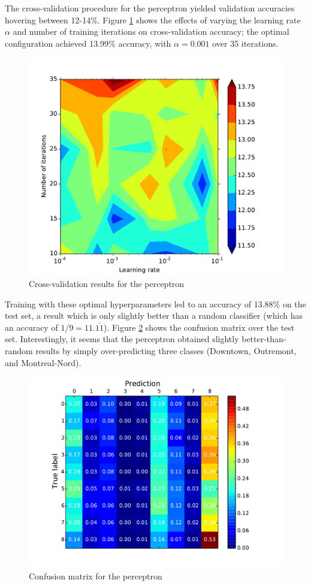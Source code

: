 \documentclass{acm_proc_article-sp}
\begin{document}
The cross-validation procedure for the perceptron yielded validation accuracies hovering between 12-14\%. Figure \ref{fig:perceptron-crossval} shows the effects of varying the learning rate $\alpha$ and number of training iterations on cross-validation accuracy; the optimal configuration achieved 13.99\% accuracy, with $\alpha = 0.001$ over 35 iterations. 
\begin{figure}[h!]
\includegraphics[width=\linewidth]{perceptron_crossval.pdf}
		\caption{Cross-validation results for the perceptron}
		\label{fig:perceptron-crossval}
\end{figure}

Training with these optimal hyperparameters led to an accuracy of 13.88\% on the test set, a result which is only slightly better than a random classifier (which has an accuracy of $1/9 = 11.\bar{11}$). Figure \ref{fig:perceptron-conf} shows the confusion matrix over the test set. Interestingly, it seems that the perceptron obtained slightly better-than-random results by simply over-predicting three classes (Downtown, Outremont, and Montreal-Nord). 
\begin{figure}[h!]
\includegraphics[width=\linewidth]{perceptron_confusion.pdf}
		\caption{Confusion matrix for the perceptron}
		\label{fig:perceptron-conf}
\end{figure}
\end{document}
